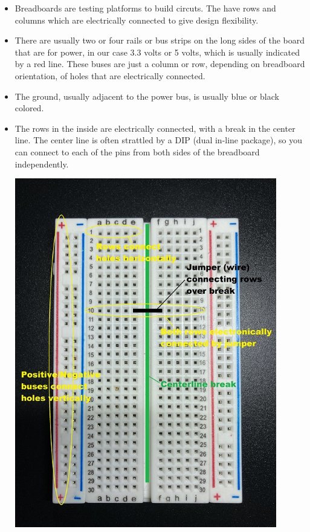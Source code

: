 \documentclass{article}\usepackage[]{graphicx}\usepackage[]{color}
\begin{document}
\begin{itemize}
\item Breadboards are testing platforms to build circuts. The have rows and columns which are electrically connected to give design flexibility. 
\item There are usually two or four rails or bus strips on the long sides of the board that are for power, in our case 3.3 volts or 5 volts, which is usually indicated by a red line. These buses are just a column or row, depending on breadboard orientation, of holes that are electrically connected. 
\item The ground, usually adjacent to the power bus, is usually blue or black colored. 
\item The rows in the inside are electrically connected, with a break in the center line. The center line is often strattled by a DIP (dual in-line package), so you can connect to each of the pins from both sides of the breadboard independently. 
\newline
\begin{center}
\includegraphics[width=0.90\textwidth]{bb2}
\end{center}
\end{itemize}
\end{document}

